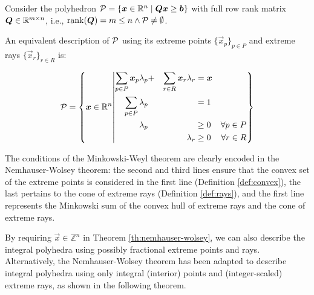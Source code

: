 \begin{theorem}\label{th:nemhauser-wolsey}
Consider the polyhedron $\mathcal{P} = \{{\bm{x}} \in \mathbb{R}^n \mid {\bm{Q}} {\bm{x}} \geq {\bm{b}}\}$ with full row rank matrix ${\bm{Q}} \in \mathbb{R}^{m \times n}$, i.e., $\operatorname{rank}({\bm{Q}}) = m \leq n \land \mathcal{P} \neq \emptyset$.

An equivalent description of $\mathcal{P}$ using its extreme points $\{\vec{x}_p\}_{p \in P}$ and extreme rays $\{\vec{x}_r\}_{r \in R}$ is:

\begin{equation}
\mathcal{P} = \left\{ {\bm{x}} \in \mathbb{R}^n \middle\vert
\begin{aligned}
\sum_{p \in P} {\bm{x}}_p \lambda_p &+ &\sum_{r \in R} {\bm{x}}_r \lambda_r &= {\bm{x}} &\\
\sum_{p \in P} \lambda_p & & &= 1 &\\
\lambda_p & & &\geq 0 &\forall p \in P\\
& &\lambda_r &\geq 0 &\forall r \in R
\end{aligned}
\right\}
\end{equation}
\end{theorem}

The conditions of the Minkowski-Weyl theorem are clearly encoded in the Nemhauser-Wolsey theorem: the second and third lines ensure that the convex set of the extreme points is considered in the first line (Definition \ref{def:convex}), the last pertains to the cone of extreme rays (Definition \ref{def:rays}), and the first line represents the Minkowski sum of the convex hull of extreme rays and the cone of extreme rays.

By requiring $\vec{x} \in \mathbb{Z}^n$ in Theorem \ref{th:nemhauser-wolsey}, we can also describe the integral polyhedra using possibly fractional extreme points and rays. Alternatively, the Nemhauser-Wolsey theorem has been adapted to describe integral polyhedra using only integral (interior) points and (integer-scaled) extreme rays, as shown in the following theorem.

